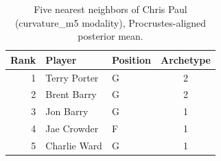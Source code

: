\begin{table}[htbp]
  \centering\small
  \begin{tabular}{rllc}
    \toprule
    Rank & Player & Position & Archetype \\
    \midrule
    1 & Terry Porter & G & 2 \\
    2 & Brent Barry & G & 2 \\
    3 & Jon Barry & G & 1 \\
    4 & Jae Crowder & F & 1 \\
    5 & Charlie Ward & G & 1 \\
    \bottomrule
  \end{tabular}
  \caption{Five nearest neighbors of Chris Paul (curvature_m5 modality), Procrustes-aligned posterior mean.}
  \label{tab:Chris_Paul_neighbors_curvature_m5}
\end{table}

